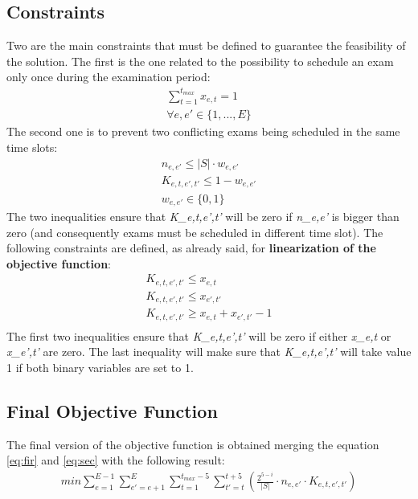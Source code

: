 \documentclass[12pt]{article}
\begin{document}
\subsection{Constraints}
Two  are the main constraints that must be defined to guarantee the feasibility of the solution.
The first is the one related to the possibility to schedule an exam only once during the examination period:
\begin{equation}
  \begin{gathered}
     \sum_{t=1}^{t_{max}} x_{e,t} = 1\\
     \forall e, e' \in \{1,...,E\}
  \end{gathered}
\end{equation}
The second one is to prevent two conflicting exams being scheduled in the same time slots:
\begin{equation}
  \begin{gathered}
     n_{e,e'} \leq |S| \cdot w_{e,e'}\\
     K_{e,t,e',t'} \leq 1 - w_{e,e'}\\
     w_{e,e'} \in \{0,1\}
  \end{gathered}
\end{equation}
The two inequalities ensure that \textit{K_{e,t,e',t'}} will be zero if \textit{n_{e,e'}} is bigger than zero (and consequently exams must be scheduled in different time slot).
The following constraints are defined, as already said, for \textbf{linearization of the objective function}:
\begin{equation}
  \begin{gathered}
     K_{e,t,e',t'} \leq x_{e,t}\\
     K_{e,t,e',t'} \leq x_{e',t'}\\
     K_{e,t,e',t'} \geq x_{e,t} + x_{e',t'} - 1\\
     \label{eq:linearize}
  \end{gathered}
\end{equation}
The first two inequalities ensure that \textit{K_{e,t,e',t'}} will be zero if either \textit{x_{e,t}} or \textit{x_{e',t'}} are zero. The last inequality will make sure that \textit{K_{e,t,e',t'}} will take value 1 if both binary variables are set to 1.

\subsection{Final Objective Function}
The final version of the objective function is obtained merging the equation \ref{eq:fir} and \ref{eq:sec} with the following result:
\begin{equation}
  \begin{gathered}
    min\sum_{e=1}^{E-1}\sum_{e'=e+1}^{E}\sum_{t=1}^{t_{max}-5}\sum_{t'=t}^{t+5} (\frac{2^{5-i}}{|S|} \cdot n_{e,e'} \cdot K_{e,t,e',t'})
    \label{eq:final}
  \end{gathered}
\end{equation}
\end{document}
